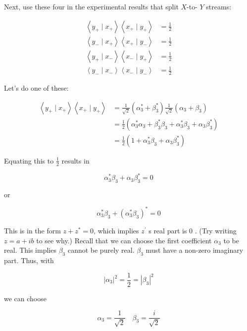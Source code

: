 \documentclass[main.tex]{subfiles}
\begin{document}
    Next, use these four in the experimental results that split $X$-to- $Y$ streams:
    
    $$
    \begin{aligned}
    \left\langle y_{+} \mid x_{+}\right\rangle\left\langle x_{+} \mid y_{+}\right\rangle &=\frac{1}{2} \\
    \left\langle y_{-} \mid x_{+}\right\rangle\left\langle x_{+} \mid y_{-}\right\rangle &=\frac{1}{2} \\
    \left\langle y_{+} \mid x_{-}\right\rangle\left\langle x_{-} \mid y_{+}\right\rangle &=\frac{1}{2} \\
    \left\langle y_{-} \mid x_{-}\right\rangle\left\langle x_{-} \mid y_{-}\right\rangle &=\frac{1}{2}
    \end{aligned}
    $$
    
    Let's do one of these:
    
    $$
    \begin{aligned}
    \left\langle y_{+} \mid x_{+}\right\rangle\left\langle x_{+} \mid y_{+}\right\rangle &=\frac{1}{\sqrt{2}}\left(\alpha_{3}^{*}+\beta_{3}^{*}\right) \frac{1}{\sqrt{2}}\left(\alpha_{3}+\beta_{3}\right) \\
    &=\frac{1}{2}\left(\alpha_{3}^{*} \alpha_{3}+\beta_{3}^{*} \beta_{3}+\alpha_{3}^{*} \beta_{3}+\alpha_{3} \beta_{3}^{*}\right) \\
    &=\frac{1}{2}\left(1+\alpha_{3}^{*} \beta_{3}+\alpha_{3} \beta_{3}^{*}\right)
    \end{aligned}
    $$
    
    Equating this to $\frac{1}{2}$ results in
    
    $$
    \alpha_{3}^{*} \beta_{3}+\alpha_{3} \beta_{3}^{*}=0
    $$
    
    or
    
    $$
    \alpha_{3}^{*} \beta_{3}+\left(\alpha_{3}^{*} \beta_{3}\right)^{*}=0
    $$
    
    This is in the form $z+z^{*}=0$, which implies $z^{\prime}$ s real part is 0 . (Try writing $z=a+i b$ to see why.) Recall that we can choose the first coefficient $\alpha_{3}$ to be real. This implies $\beta_{3}$ cannot be purely real. $\beta_{3}$ must have a non-zero imaginary part. Thus, with
    
    $$
    \left|\alpha_{3}\right|^{2}=\frac{1}{2}=\left|\beta_{3}\right|^{2}
    $$
    
    we can choose
    
    $$
    \alpha_{3}=\frac{1}{\sqrt{2}} \quad \beta_{3}=\frac{i}{\sqrt{2}}
    $$
    
\end{document}
